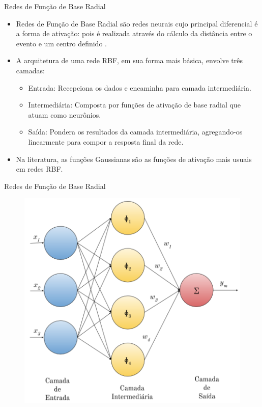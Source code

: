 \documentclass[10pt]{beamer}
\begin{document}
\begin{frame}{Redes de Função de Base Radial}
    \begin{itemize}
        \item<1 -> \alert{Redes de Função de Base Radial} são redes neurais cujo principal diferencial é a forma de ativação: pois é realizada através do cálculo da distância entre o evento e um centro definido \cite{Braga:RedesNeuraisTeoriaAplicacoes}.
        \item<1 -> A arquitetura de uma rede RBF, em sua forma mais básica, envolve três camadas:
        \begin{itemize}
            \item<1 -> \alert{Entrada}: Recepciona os dados e encaminha para camada intermediária.
            \item<1 -> \alert{Intermediária}: Composta por funções de ativação de base radial que atuam como neurônios.
            \item<1 -> \alert{Saída}: Pondera os resultados da camada intermediária, agregando-os linearmente para compor a resposta final da rede.
        \end{itemize}
        \item<1 -> Na literatura, as funções Gaussianas são as funções de ativação mais usuais em redes RBF.
      \end{itemize}
\end{frame}

\begin{frame}{Redes de Função de Base Radial}
    \begin{figure}[H]
    \begin{center}
        \includegraphics[scale=0.65]{imagens/rbf_arq.png}
    \end{center}
    \end{figure}
\end{frame}
\end{document}
